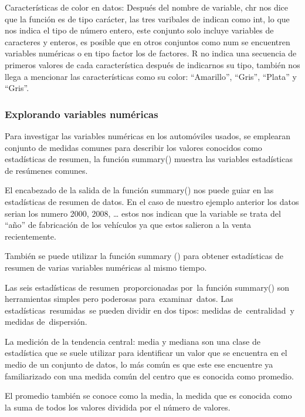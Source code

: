 \documentclass[
  letterpaper,
  DIV=11,
  numbers=noendperiod]{scrartcl}
\begin{document}
Características de color en datos: Después del nombre de variable, chr
nos dice que la función es de tipo carácter, las tres varibales de
indican como int, lo que nos indica el tipo de número entero, este
conjunto solo incluye variables de caracteres y enteros, es posible que
en otros conjuntos como num se encuentren variables numéricas o en tipo
factor los de factores. R no indica una secuencia de primeros valores de
cada característica después de indicarnos su tipo, también nos llega a
mencionar las características como su color: ``Amarillo'', ``Gris'',
``Plata'' y ``Gris''.

\hypertarget{explorando-variables-numuxe9ricas}{%
\subsubsection{Explorando variables
numéricas}\label{explorando-variables-numuxe9ricas}}

Para investigar las variables numéricas en los automóviles usados, se
emplearan conjunto de medidas comunes para describir los valores
conocidos como estadísticas de resumen, la función summary() muestra las
variables estadísticas de resúmenes comunes.

El encabezado de la salida de la función summary() nos puede guiar en
las estadísticas de resumen de datos. En el caso de nuestro ejemplo
anterior los datos serian los numero 2000, 2008, \ldots{} estos nos
indican que la variable se trata del ``año'' de fabricación de los
vehículos ya que estos salieron a la venta recientemente.

También se puede utilizar la función summary () para obtener
estadísticas de resumen de varias variables numéricas al mismo tiempo.

Las seis estadísticas de resumen~proporcionadas por~la función summary()
son herramientas simples pero poderosas para~examinar~datos. Las
estadísticas~resumidas~se pueden dividir en dos tipos: medidas
de~centralidad~y medidas de~dispersión.

La medición de la tendencia central: media y mediana son una clase de
estadística que se suele utilizar para identificar un valor que se
encuentra en el medio de un conjunto de datos, lo más común es que este
ese encuentre ya familiarizado con una medida común del centro que es
conocida como promedio.

El promedio también se conoce como la media, la medida que es conocida
como la suma de todos los valores dividida por el número de valores.
\end{document}
